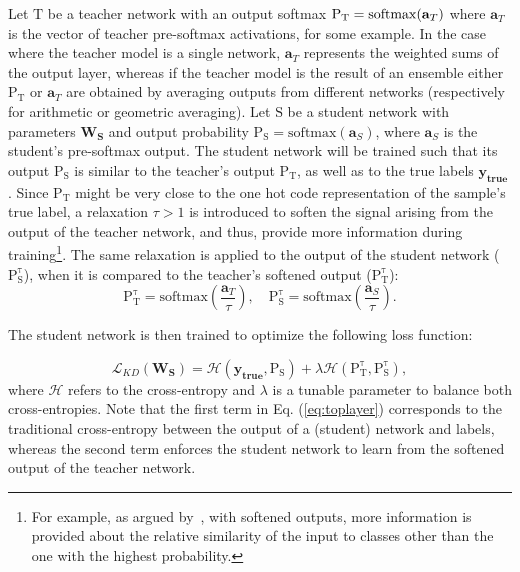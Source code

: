 \documentclass{article} %
\begin{document}
Let $\mathrm{T}$ be a teacher network with an output softmax $\mathrm{P_T}={\rm softmax}(\mathbf{a}_T)$
where $\mathbf{a}_T$ is the vector of teacher pre-softmax activations, for some example. In the case where the teacher model
is a single network, $\mathbf{a}_T$ represents the weighted sums of the output layer, whereas if
the teacher model is the result of an ensemble either $\mathrm{P_T}$ or $\mathbf{a}_T$ are obtained
by averaging outputs from different networks (respectively for arithmetic or geometric averaging).
Let $\mathrm{S}$ be a student network with parameters $\mathbf{W_S}$ and output probability $\mathrm{P_S} = \mathrm{softmax}(\mathbf{a}_S)$, where $\mathbf{a}_S$ is the
student's pre-softmax output. The student network will be trained
such that its output $\mathrm{P_S}$ is similar to the teacher's output
$\mathrm{P_T}$, as well as to the true labels $\mathbf{y_{true}}$. Since
$\mathrm{P_T}$ might be very close to the one hot code representation of the
sample's true label, a relaxation $\tau > 1$ is introduced to soften the signal
arising from the output of the teacher network, and thus, provide more information during
training\footnote{For example, as argued by~\citet{Hinton14}, with softened outputs, more information is provided about the
relative similarity of the input to classes other than the one with the highest probability.}. 
The same relaxation is applied to the output of the student network ($\mathrm{P_S^\tau}$), 
when it is compared to the teacher's softened output ($\mathrm{P_T^\tau}$):
\begin{equation}
\mathrm{P_T^\tau} = \mathrm{softmax}\left(\frac{\mathbf{a}_T}{\tau}\right),\quad \mathrm{P_S^\tau} = \mathrm{softmax}\left(\frac{\mathbf{a}_S}{\tau}\right).
\end{equation}


The student network is then trained to optimize the following loss
function:

\begin{equation}
\mathcal{L}_{KD}(\mathbf{W_S}) = \mathcal{H}(\mathbf{y_{true}},\mathrm{P_S}) +
\lambda \mathcal{H}(\mathrm{P_T^\tau}, \mathrm{P_S^\tau}),
\label{eq:toplayer}
\end{equation}
where $\mathcal{H}$ refers to the cross-entropy and $\lambda$ is a
tunable parameter to balance both cross-entropies. Note that the first term in
Eq. (\ref{eq:toplayer}) corresponds to the traditional cross-entropy between the
output of a (student) network and labels, whereas the second term enforces the
student network to learn from the softened output of the teacher network.
\end{document}
